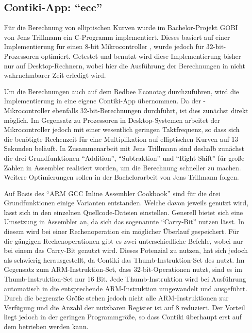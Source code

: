 \subsection{Contiki-App: "`ecc"'}

Für die Berechnung von elliptischen Kurven wurde im Bachelor-Projekt GOBI von Jens Trillmann ein C-Programm implementiert.
Dieses basiert auf einer Implementierung für einen 8-bit Mikrocontroller \cite{eccori}, wurde jedoch für 32-bit-Prozessoren optimiert.
Getestet und benutzt wird diese Implementierung bisher nur auf Desktop-Rechnern, wobei hier die Ausführung der Berechnungen in nicht
wahrnehmbarer Zeit erledigt wird.

Um die Berechnungen auch auf dem Redbee Econotag durchzuführen, wird die Implementierung in eine eigene Contiki-App übernommen.
Da der -Mikrocontroller ebenfalls 32-bit-Berechnungen durchführt, ist dies zunächst direkt möglich. Im Gegensatz
zu Prozessoren in Desktop-Systemen arbeitet der Mikrocontroller jedoch mit einer wesentlich geringen Taktfrequenz, so dass sich
die benötigte Rechenzeit für eine Multiplikation auf elliptischen Kurven auf 13 Sekunden beläuft. In Zusammenarbeit mit Jens
Trillmann sind deshalb zunächst die drei Grundfunktionen "`Addition"', "`Subtraktion"' und "`Right-Shift"' für große Zahlen in
Assembler realisiert worden, um die Berechnung schneller zu machen. Weitere Optimierungen sollen in der Bachelorarbeit von Jens
Trillmann folgen.

Auf Basis des "`ARM GCC Inline Assembler Cookbook"' \cite{armasm} sind für die drei Grundfunktionen einige Varianten entstanden.
Welche davon jeweils genutzt wird, lässt sich in den einzelnen Quellcode-Dateien einstellen. Generell bietet sich eine Umsetzung
in Assembler an, da sich das sogenannte "`Carry-Bit"' nutzen lässt. In diesem wird bei einer Rechenoperation ein möglicher Überlauf
gespeichert. Für die gängigen Rechenoperationen gibt es zwei unterschiedliche Befehle, wobei nur bei einem das Carry-Bit genutzt wird.
Dieses Potenzial zu nutzen, hat sich jedoch als schwierig herausgestellt, da Contiki das Thumb-Instruktion-Set des  nutzt.
Im Gegensatz zum ARM-Instruktion-Set, dass 32-bit-Operationen nutzt, sind es im Thumb-Instruktion-Set nur 16 Bit. Jede Thumb-Instruktion
wird bei Ausführung automatisch in die entsprechende ARM-Instruktion umgewandelt und ausgeführt. Durch die begrenzte Größe stehen jedoch
nicht alle ARM-Instruktionen zur Verfügung und die Anzahl der nutzbaren Register ist auf 8 reduziert. Der Vorteil liegt jedoch in der
geringen Programmgröße, so dass Contiki überhaupt erst auf dem  betrieben werden kann.

